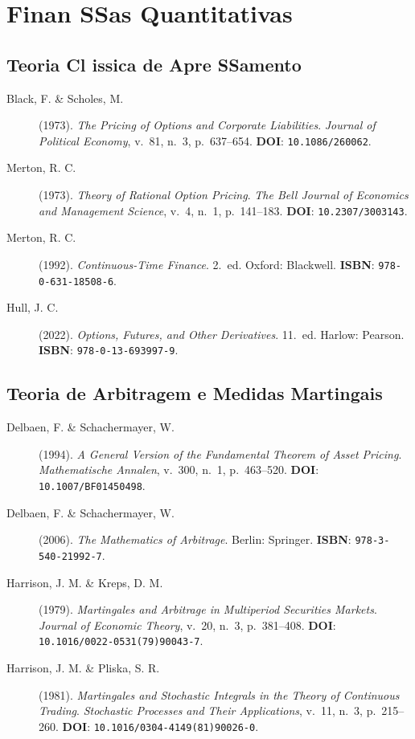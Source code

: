 \section{Finan SSas Quantitativas}
\label{sec:ref_financas}

\subsection{Teoria Cl issica de Apre SSamento}

\begin{description}
\item[Black, F. \& Scholes, M.] (1973). \textit{The Pricing of Options and Corporate Liabilities}. \textit{Journal of Political Economy}, v.~81, n.~3, p.~637--654. \textbf{DOI}: \texttt{10.1086/260062}.

\item[Merton, R. C.] (1973). \textit{Theory of Rational Option Pricing}. \textit{The Bell Journal of Economics and Management Science}, v.~4, n.~1, p.~141--183. \textbf{DOI}: \texttt{10.2307/3003143}.

\item[Merton, R. C.] (1992). \textit{Continuous-Time Finance}. 2.~ed. Oxford: Blackwell. \textbf{ISBN}: \texttt{978-0-631-18508-6}.

\item[Hull, J. C.] (2022). \textit{Options, Futures, and Other Derivatives}. 11.~ed. Harlow: Pearson. \textbf{ISBN}: \texttt{978-0-13-693997-9}.
\end{description}

\subsection{Teoria de Arbitragem e Medidas Martingais}

\begin{description}
\item[Delbaen, F. \& Schachermayer, W.] (1994). \textit{A General Version of the Fundamental Theorem of Asset Pricing}. \textit{Mathematische Annalen}, v.~300, n.~1, p.~463--520. \textbf{DOI}: \texttt{10.1007/BF01450498}.

\item[Delbaen, F. \& Schachermayer, W.] (2006). \textit{The Mathematics of Arbitrage}. Berlin: Springer. \textbf{ISBN}: \texttt{978-3-540-21992-7}.

\item[Harrison, J. M. \& Kreps, D. M.] (1979). \textit{Martingales and Arbitrage in Multiperiod Securities Markets}. \textit{Journal of Economic Theory}, v.~20, n.~3, p.~381--408. \textbf{DOI}: \texttt{10.1016/0022-0531(79)90043-7}.

\item[Harrison, J. M. \& Pliska, S. R.] (1981). \textit{Martingales and Stochastic Integrals in the Theory of Continuous Trading}. \textit{Stochastic Processes and Their Applications}, v.~11, n.~3, p.~215--260. \textbf{DOI}: \texttt{10.1016/0304-4149(81)90026-0}.
\end{description}

